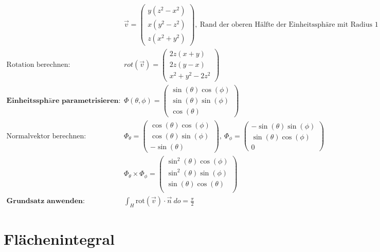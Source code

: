 \documentclass[11pt]{article}
\begin{document}
\begin{equation*}
\begin{split}
	& \vec{v} = \begin{pmatrix}
		y(z^2-x^2) \\ x(y^2 - z^2) \\ z(x^2 + y^2)
	\end{pmatrix},\ \text{Rand der oberen H{\"a}lfte der Einheitssph{\"a}re mit Radius $1$ um $(0,0, 0)$} \\
	\text{Rotation berechnen:}\quad & rot(\vec{v}) = \begin{pmatrix}
		2z(x+y) \\ 2z(y-x) \\ x^2 + y^2 - 2z^2
	\end{pmatrix} \\
	\textbf{Einheitssph{\"a}re parametrisieren:}\quad & \Phi(\theta, \phi) = \begin{pmatrix}
		\sin(\theta)\cos(\phi) \\ \sin(\theta)\sin(\phi) \\ \cos(\theta)
	\end{pmatrix} \\
	\text{Normalvektor berechnen:}\quad & \Phi_\theta = \begin{pmatrix}
		\cos(\theta)\cos(\phi) \\ \cos(\theta)\sin(\phi) \\ -\sin(\theta)
	\end{pmatrix},\ \Phi_\phi = \begin{pmatrix}
		-\sin(\theta)\sin(\phi) \\ \sin(\theta)\cos(\phi) \\ 0
	\end{pmatrix} \\
	& \Phi_\theta \times \Phi_\phi = \begin{pmatrix}
		\sin^2(\theta)\cos(\phi) \\ \sin^2(\theta)\sin(\phi) \\ \sin(\theta)\cos(\theta) \\
	\end{pmatrix} \\
	\textbf{Grundsatz anwenden:} \quad & \int_H \text{rot}(\vec{v}) \cdot \vec{n}\ do = \frac{\pi}{2}
\end{split}
\end{equation*}

\section{Fl{\"a}chenintegral}
\end{document}
